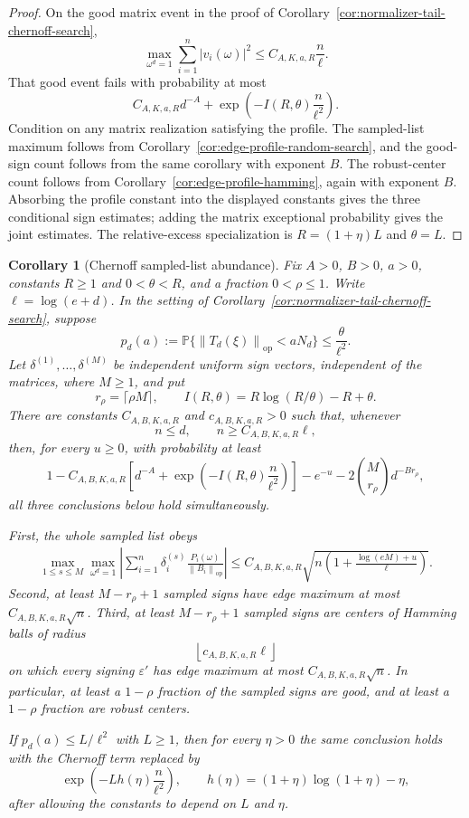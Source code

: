 \documentclass[11pt]{amsart}
\numberwithin{equation}{section}
\newtheorem{corollary}[theorem]{Corollary}
\theoremstyle{definition}
\theoremstyle{remark}
\newcommand{\op}{\mathrm{op}}
\newcommand{\Prob}{\mathbb P}
\newcommand{\norm}[1]{\left\lVert #1\right\rVert}
\newcommand{\eps}{\varepsilon}
\begin{document}
\begin{proof}
On the good matrix event in the proof of
Corollary~\ref{cor:normalizer-tail-chernoff-search},
\[
  \max_{\omega^d=1}\sum_{i=1}^n
  |v_i(\omega)|^2
  \le C_{A,K,a,R}\frac n\ell .
\]
That good event fails with probability at most
\[
  C_{A,K,a,R}d^{-A}
  +\exp\left(-I(R,\theta)\frac n{\ell^2}\right).
\]
Condition on any matrix realization satisfying the profile.  The sampled-list
maximum follows from Corollary~\ref{cor:edge-profile-random-search}, and the
good-sign count follows from the same corollary with exponent \(B\).  The
robust-center count follows from Corollary~\ref{cor:edge-profile-hamming}, again
with exponent \(B\).  Absorbing the profile constant into the displayed
constants gives the three conditional sign estimates; adding the matrix
exceptional probability gives the joint estimates.  The relative-excess
specialization is \(R=(1+\eta)L\) and \(\theta=L\).
\end{proof}

\begin{corollary}[Chernoff sampled-list abundance]
\label{cor:normalizer-tail-chernoff-abundance}
Fix \(A>0\), \(B>0\), \(a>0\), constants \(R\ge1\) and \(0<\theta<R\), and a
fraction \(0<\rho\le1\).  Write \(\ell=\log(e+d)\).  In the setting of
Corollary~\ref{cor:normalizer-tail-chernoff-search}, suppose
\[
  p_d(a):=\Prob\{\norm{T_d(\xi)}_{\op}<aN_d\}\le \frac{\theta}{\ell^2}.
\]
Let \(\delta^{(1)},\ldots,\delta^{(M)}\) be independent uniform sign vectors,
independent of the matrices, where \(M\ge1\), and put
\[
  r_\rho=\lceil \rho M\rceil,\qquad
  I(R,\theta)=R\log(R/\theta)-R+\theta .
\]
There are constants \(C_{A,B,K,a,R}\) and \(c_{A,B,K,a,R}>0\) such that,
whenever
\[
  n\le d,\qquad n\ge C_{A,B,K,a,R}\ell ,
\]
then, for every \(u\ge0\), with probability at least
\[
  1-
  C_{A,B,K,a,R}\left[
    d^{-A}+\exp\left(-I(R,\theta)\frac n{\ell^2}\right)\right]
  -e^{-u}-2\binom{M}{r_\rho}d^{-B r_\rho},
\]
all three conclusions below hold simultaneously.

First, the whole sampled list obeys
\[
\begin{aligned}
  \max_{1\le s\le M}\max_{\omega^d=1}
  \left|\sum_{i=1}^n\delta_i^{(s)}
  \frac{P_i(\omega)}{\norm{B_i}_{\op}}\right|
  \le
  C_{A,B,K,a,R}\sqrt{
    n\left(1+\frac{\log(eM)+u}{\ell}\right)} .
\end{aligned}
\]
Second, at least \(M-r_\rho+1\) sampled signs have edge maximum at most
\(C_{A,B,K,a,R}\sqrt n\).  Third, at least \(M-r_\rho+1\) sampled signs are
centers of Hamming balls of radius
\[
  \left\lfloor c_{A,B,K,a,R}\ell\right\rfloor
\]
on which every signing \(\eps'\) has edge maximum at most
\(C_{A,B,K,a,R}\sqrt n\).  In particular, at least a \(1-\rho\) fraction of the
sampled signs are good, and at least a \(1-\rho\) fraction are robust centers.

If \(p_d(a)\le L/\ell^2\) with \(L\ge1\), then for every \(\eta>0\) the same
conclusion holds with the Chernoff term replaced by
\[
  \exp\left(-Lh(\eta)\frac n{\ell^2}\right),
  \qquad h(\eta)=(1+\eta)\log(1+\eta)-\eta ,
\]
after allowing the constants to depend on \(L\) and \(\eta\).
\end{corollary}
\end{document}
